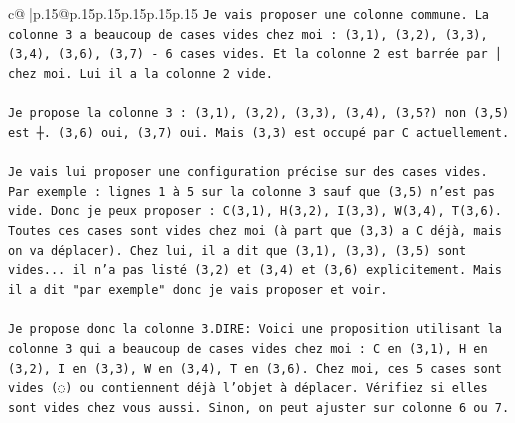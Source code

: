 \documentclass{article}
\begin{document}
{\begin{supertabular}{c@{$\;$}|p{.15\linewidth}@{}p{.15\linewidth}p{.15\linewidth}p{.15\linewidth}p{.15\linewidth}p{.15\linewidth}}
{{{\texttt{Je vais proposer une colonne commune. La colonne 3 a beaucoup de cases vides chez moi : (3,1), (3,2), (3,3), (3,4), (3,6), (3,7) {-} 6 cases vides. Et la colonne 2 est barrée par │ chez moi. Lui il a la colonne 2 vide. } \\
\\ 
\texttt{Je propose la colonne 3 : (3,1), (3,2), (3,3), (3,4), (3,5?) non (3,5) est ┼. (3,6) oui, (3,7) oui. Mais (3,3) est occupé par C actuellement. } \\
\\ 
\texttt{Je vais lui proposer une configuration précise sur des cases vides. Par exemple : lignes 1 à 5 sur la colonne 3 sauf que (3,5) n'est pas vide. Donc je peux proposer : C(3,1), H(3,2), I(3,3), W(3,4), T(3,6). Toutes ces cases sont vides chez moi (à part que (3,3) a C déjà, mais on va déplacer). Chez lui, il a dit que (3,1), (3,3), (3,5) sont vides... il n'a pas listé (3,2) et (3,4) et (3,6) explicitement. Mais il a dit "par exemple" donc je vais proposer et voir.} \\
\\ 
\texttt{Je propose donc la colonne 3.DIRE: Voici une proposition utilisant la colonne 3 qui a beaucoup de cases vides chez moi : C en (3,1), H en (3,2), I en (3,3), W en (3,4), T en (3,6). Chez moi, ces 5 cases sont vides (◌) ou contiennent déjà l'objet à déplacer. Vérifiez si elles sont vides chez vous aussi. Sinon, on peut ajuster sur colonne 6 ou 7.} \\
            }
        }
    }
     \\ \\


\end{supertabular}}
\end{document}
